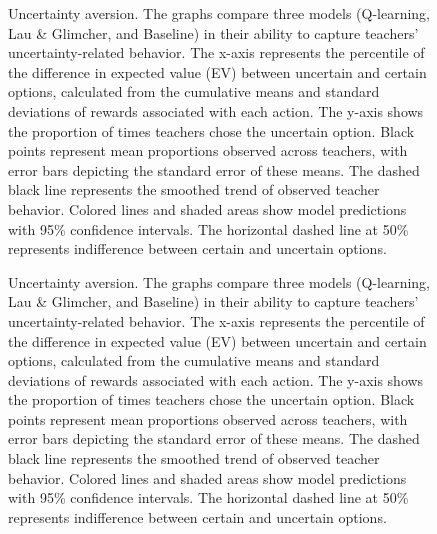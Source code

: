 \documentclass[
  number,
  preprint,
  3p,
  onecolumn]{elsarticle}
\begin{document}
\begin{figure}


\caption{\label{fig-uncertainty-aversion-1}Uncertainty aversion. The
graphs compare three models (Q-learning, Lau \& Glimcher, and Baseline)
in their ability to capture teachers' uncertainty-related behavior. The
x-axis represents the percentile of the difference in expected value
(EV) between uncertain and certain options, calculated from the
cumulative means and standard deviations of rewards associated with each
action. The y-axis shows the proportion of times teachers chose the
uncertain option. Black points represent mean proportions observed
across teachers, with error bars depicting the standard error of these
means. The dashed black line represents the smoothed trend of observed
teacher behavior. Colored lines and shaded areas show model predictions
with 95\% confidence intervals. The horizontal dashed line at 50\%
represents indifference between certain and uncertain options.}

\end{figure}%

\begin{figure}


\caption{\label{fig-uncertainty-aversion-2}Uncertainty aversion. The
graphs compare three models (Q-learning, Lau \& Glimcher, and Baseline)
in their ability to capture teachers' uncertainty-related behavior. The
x-axis represents the percentile of the difference in expected value
(EV) between uncertain and certain options, calculated from the
cumulative means and standard deviations of rewards associated with each
action. The y-axis shows the proportion of times teachers chose the
uncertain option. Black points represent mean proportions observed
across teachers, with error bars depicting the standard error of these
means. The dashed black line represents the smoothed trend of observed
teacher behavior. Colored lines and shaded areas show model predictions
with 95\% confidence intervals. The horizontal dashed line at 50\%
represents indifference between certain and uncertain options.}

\end{figure}%
\end{document}
